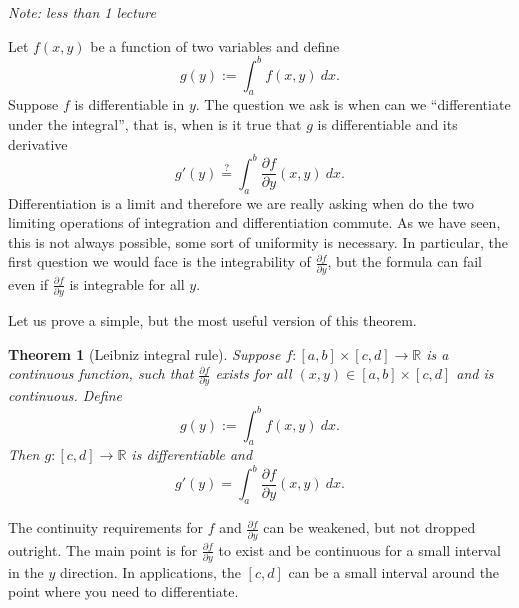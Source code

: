 \documentclass[12pt]{book}
\newcommand{\R}{{\mathbb{R}}}
\newcommand{\myindex}[1]{#1\index{#1}}
\newcommand{\sectionnotes}[1]{\noindent \emph{Note: #1} \medskip \par}
\theoremstyle{plain}
\newtheorem{thm}{Theorem}[section]
\theoremstyle{remark}
\theoremstyle{definition}
\theoremstyle{exercise}
\theoremstyle{example}
\begin{document}
\sectionnotes{less than 1 lecture}

Let $f(x,y)$ be a function of two variables and define
\begin{equation*}
g(y) := \int_a^b f(x,y) ~dx .
\end{equation*}
Suppose $f$ is differentiable in $y$.  The question we ask is
when can we ``differentiate under the integral'', that is,
when is it true that $g$ is differentiable and its derivative
\begin{equation*}
g'(y) \overset{?}{=} \int_a^b \frac{\partial f}{\partial y}(x,y) ~dx .
\end{equation*}
Differentiation is a limit and therefore we are really asking when do the
two limiting operations of integration and differentiation commute.
As we have seen, this is not always possible, some sort of uniformity is
necessary.  In particular, the first
question we would face is the integrability of
$\frac{\partial f}{\partial y}$, but the formula can fail even if
$\frac{\partial f}{\partial y}$ is integrable for all $y$.

Let us prove a simple, but the most useful version of this theorem.

\begin{thm}[\myindex{Leibniz integral rule}]
Suppose $f \colon [a,b] \times [c,d] \to \R$ is a continuous function,
such that $\frac{\partial f}{\partial y}$ exists for all $(x,y) \in [a,b]
\times [c,d]$ and is continuous.  Define
\begin{equation*}
g(y) := \int_a^b f(x,y) ~dx .
\end{equation*}
Then $g \colon [c,d] \to \R$ is differentiable and
\begin{equation*}
g'(y) = \int_a^b \frac{\partial f}{\partial y}(x,y) ~dx .
\end{equation*}
\end{thm}

The continuity requirements for $f$ and
$\frac{\partial f}{\partial y}$ can be
weakened, but not dropped outright.  The main point is for
$\frac{\partial f}{\partial y}$ to exist and be continuous for a small
interval in the $y$ direction.  In applications, the $[c,d]$ can be a
small interval around the point where you need to differentiate.
\end{document}
